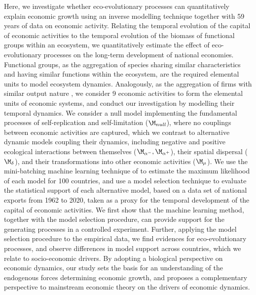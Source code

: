  Here, we investigate whether eco-evolutionary processes can quantitatively explain economic growth using an inverse modelling technique together with 59 years of data on economic activity. Relating the temporal evolution of the capital of economic activities to the temporal evolution of the biomass of functional groups within an ecosystem, we quantitatively estimate the effect of eco-evolutionary processes on the long-term development of national economies.
  Functional groups, as the aggregation of species sharing similar characteristics and having similar functions within the ecosystem, are the required elemental units to model ecosystem dynamics. Analogously, as the aggregation of firms with similar output nature \citep{Applegate2021}, we consider 9 economic activities to form the elemental units of economic systems, and conduct our investigation by modelling their temporal dynamics.
  We consider a null model implementing the fundamental processes of self-replication and self-limitation ($\modnull$), where no couplings between economic activities are captured, which we contrast to alternative dynamic models coupling their dynamics, including negative and positive ecological interactions between themselves ($\modalphan,\modalphap$), their spatial dispersal ($\moddelta$), and their transformations into other economic activities ($\modmu$).
  We use the mini-batching machine learning technique of \cite{Boussange2022a} to estimate the maximum likelihood of each model for 100 countries, and use a model selection technique to evaluate the statistical support of each alternative model, based on a data set of national exports from 1962 to 2020, taken as a proxy for the temporal development of the capital of economic activities. 
  We first show that the machine learning method, together with the model selection procedure, can provide support for the generating processes in a controlled experiment.
  Further, applying the model selection procedure to the empirical data, we find evidences for eco-evolutionary processes, and observe differences in model support across countries, which we relate to socio-economic drivers. 
  By adopting a biological perspective on economic dynamics, our study sets the basis for an understanding of the endogenous forces determining economic growth, and proposes a complementary perspective to mainstream economic theory \citep{10.1093/cje/bet027} on the drivers of economic dynamics.


